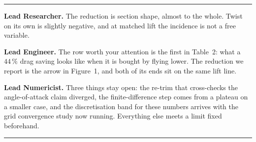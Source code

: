 \documentclass[9pt,a4paper]{article}
\renewcommand{\footnotesize}{\fontsize{6.4}{6.85}\selectfont}
\newcommand{\rolesig}[1]{\textbf{\footnotesize#1}}
\begin{document}
\vspace{2pt}
{\color{rulegrey}\rule{\textwidth}{0.5pt}}

\vspace{1pt}
{\footnotesize
\rolesig{Lead Researcher.} The reduction is section shape, almost to the whole.
Twist on its own is slightly negative, and at matched lift the incidence is not
a free variable.

\rolesig{Lead Engineer.} The row worth your attention is the first in Table~2:
what a $44\,\%$ drag saving looks like when it is bought by flying lower. The
reduction we report is the arrow in Figure~1, and both of its ends sit on the
same lift line.

\rolesig{Lead Numericist.} Three things stay open: the re-trim that cross-checks
the angle-of-attack claim diverged, the finite-difference step comes from a
plateau on a smaller case, and the discretisation band for these numbers arrives
with the grid convergence study now running. Everything else meets a limit fixed
beforehand.}

\vspace{4pt}
{\color{rulegrey}\rule{\textwidth}{0.5pt}}
\vspace{2pt}
\end{document}

